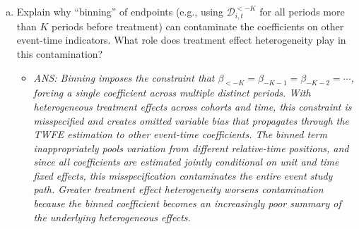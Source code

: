 \documentclass[12pt,a4paper]{article}
\newcommand{\ans}[1]{\begin{itemize}\item[$\bullet$] \textit{ANS: #1}\end{itemize}}
\begin{document}
\begin{enumerate}
\begin{enumerate}[(a)]
\item Explain why ``binning'' of endpoints (e.g., using $\mathcal{D}^{<-K}_{i,t}$ for all periods more than $K$ periods before treatment) can contaminate the coefficients on other event-time indicators. What role does treatment effect heterogeneity play in this contamination?
\ans{Binning imposes the constraint that $\beta_{<-K} = \beta_{-K-1} = \beta_{-K-2} = \cdots$, forcing a single coefficient across multiple distinct periods. With heterogeneous treatment effects across cohorts and time, this constraint is misspecified and creates omitted variable bias that propagates through the TWFE estimation to other event-time coefficients. The binned term inappropriately pools variation from different relative-time positions, and since all coefficients are estimated jointly conditional on unit and time fixed effects, this misspecification contaminates the entire event study path. Greater treatment effect heterogeneity worsens contamination because the binned coefficient becomes an increasingly poor summary of the underlying heterogeneous effects.}
\end{enumerate}

\end{enumerate}
\end{document}
